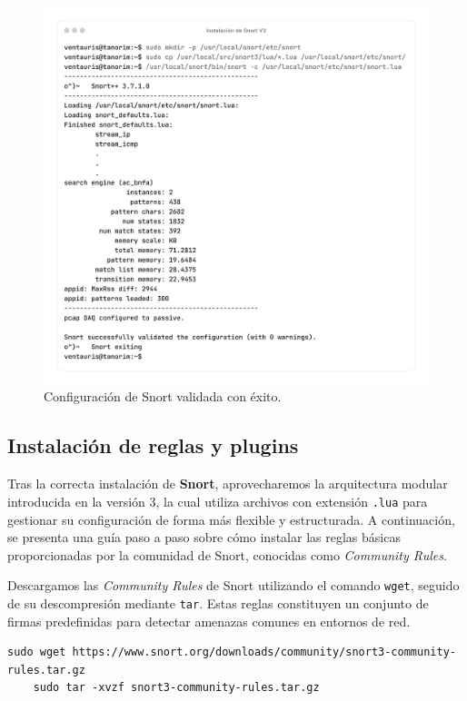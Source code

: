 \documentclass[11pt,a4paper,twoside]{report}
\begin{document}
\begin{figure}[H]
	\centering
	\includegraphics[scale=0.12]{instalacion_snort/25-25.png}
	\caption{Configuración de Snort validada con éxito.}
\end{figure}

\newpage

\subsection{Instalación de reglas y plugins}

Tras la correcta instalación de \textbf{Snort}, aprovecharemos la arquitectura modular introducida en la versión 3, la cual utiliza archivos con extensión \texttt{.lua} para gestionar su configuración de forma más flexible y estructurada. A continuación, se presenta una guía paso a paso sobre cómo instalar las reglas básicas proporcionadas por la comunidad de Snort, conocidas como \textit{Community Rules}.\newline

Descargamos las \textit{Community Rules} de Snort utilizando el comando \texttt{wget}, seguido de su descompresión mediante \texttt{tar}. Estas reglas constituyen un conjunto de firmas predefinidas para detectar amenazas comunes en entornos de red.

\begin{lstlisting}[style=commandstyle, caption={Descargando e instalando las reglas Community Rules}]
	sudo wget https://www.snort.org/downloads/community/snort3-community-rules.tar.gz
	sudo tar -xvzf snort3-community-rules.tar.gz
\end{lstlisting}
\end{document}
